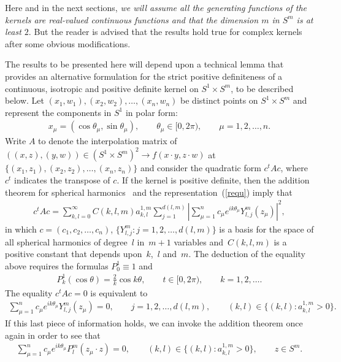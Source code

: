 \documentclass[pdftex]{sigma}
\numberwithin{equation}{section}
\def\t{\theta}
\begin{document}
Here and in the next sections, {\em we will assume all the generating functions of the kernels are real-valued continuous functions and that the dimension $m$ in $S^m$ is at least $2$}. But the reader is advised that the results hold true for complex kernels after some obvious modif\/ications.

The results to be presented here will depend upon a technical lemma that provides an alternative formulation for the strict positive def\/initeness of a continuous, isotropic and positive def\/inite kernel on $S^1 \times S^m$, to be described below. Let $(x_1,w_1),(x_2,w_2), \ldots,(x_n,w_n)$ be distinct points on $S^1 \times S^{m}$ and represent the components in $S^1$ in polar form:
\begin{gather*}
x_\mu=(\cos \t_\mu, \sin \t_\mu), \qquad \t_\mu \in [0,2\pi),\qquad \mu=1,2,\ldots,n.
\end{gather*}
Write $A$ to denote the interpolation matrix of $((x,z), (y,w)) \in (S^1 \times S^m)^2 \to f(x \cdot y, z \cdot w)$ at $\{(x_1,z_1),(x_2,z_2),\ldots, (x_n,z_n)\}$ and consider the quadratic form $c^t A c$, where $c^t$ indicates the transpose of $c$. If the kernel is positive def\/inite, then the addition theorem for spherical harmonics~\cite[p.~18]{muller} and the representation~(\ref{requ}) imply that
\begin{gather*}c^{t}Ac = \sum_{k,l=0}^\infty C(k,l,m) a_{k,l}^{1,m}\sum_{j=1}^{d(l,m)}\left|\sum_{\mu=1}^n c_\mu
e^{i k\t_\mu} Y_{l,j}^m(z_\mu)\right|^2,
\end{gather*}
in which $c=(c_1,c_2, \ldots,c_n)$, $\{Y_{l,j}^m\colon j=1,2,\ldots,d(l,m)\}$ is a basis for the space of all spherical harmonics of degree~$l$ in~$m+1$ variables and~$C(k,l,m)$ is a positive constant that depends upon~$k$,~$l$ and~$m$. The deduction of the equality above requires the formulas $P_0^1\equiv 1$ and
\begin{gather*}P_k^1(\cos \t)=\frac{2}{k} \cos k\t,\qquad t \in [0,2\pi),\qquad k=1,2,\ldots.\end{gather*}
The equality $c^tAc=0$ is equivalent to
\begin{gather*}
\sum_{\mu=1}^n c_\mu e^{i k\t_\mu} Y_{l,j}^m(z_\mu)=0, \qquad j=1,2,\ldots,d(l,m), \qquad (k,l)\in \big\{(k,l)\colon a_{k,l}^{1,m}>0\big\}.
\end{gather*}
If this last piece of information holds, we can invoke the addition theorem once again in order to see that
\begin{gather*}
\sum_{\mu=1}^n c_\mu e^{ik\t_\mu} P_l^m(z_\mu\cdot z)=0, \qquad (k,l)\in \big\{(k,l)\colon a_{k,l}^{1,m}>0\big\}, \qquad z\in S^m.
\end{gather*}
\end{document}
